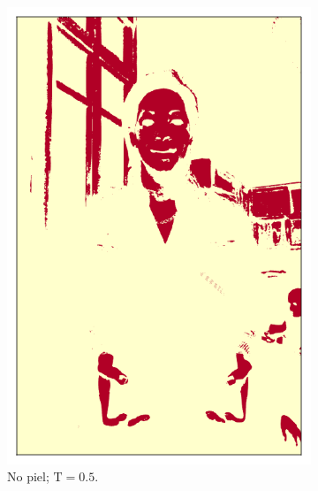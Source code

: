 \begin{figure}[ht!]
\begin{subfigure}[t]{0.2\textwidth}
        \includegraphics[width=\textwidth]{../figures/image2/image_02_treshbg_50percent.png}
        \caption{No piel; $\text{T} = 0.5$.}
    \end{subfigure}
    \begin{subfigure}[t]{0.2\textwidth}
        \centering

\end{subfigure}
\end{figure}
